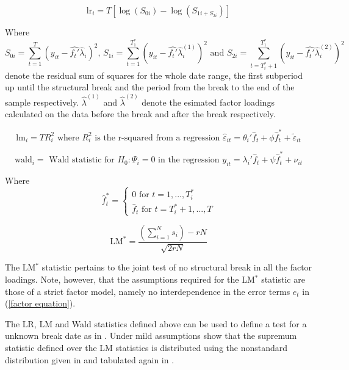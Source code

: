 \documentclass[12pt]{article}
\begin{document}
\begin{equation}
	\label{LR-Statistic}
	\text{lr}_i = T [ \log(S_{0i}) - \log(S_{1i + S_{2i}}) ]
\end{equation}

Where $$S_{0i} = \sum_{t=1}^{T}(y_{it} - \hat{f_t'} \hat \lambda_i)^2 \text{, } S_{1i} = \sum_{t=1}^{T_1^*}(y_{it} - \hat{f_t'} \hat \lambda_i^{(1)})^2 \text{ and } S_{2i} = \sum_{t=T^*_i+1}^{T_1^*}(y_{it} - \hat{f_t'} \hat \lambda_i^{(2)})^2 $$
denote the residual sum of squares for the whole date range, the first subperiod up until the structural break and the period from the break to the end of the sample respectively.
$\hat \lambda^{(1)}$ and $\hat \lambda^{(2)}$ denote the esimated factor loadings calculated on the data before the break and after the break respectively.

\begin{equation}
	\label{LM-Statistic}
	\text{lm}_i = T R^2_i \text{ where $R_i^2$ is the r-squared from a regression } \hat \varepsilon_{it} = \theta_i' \hat f_t + \phi \hat f_t^* + \tilde \varepsilon_{it}
\end{equation}

\begin{equation}
	\label{Wald-Statistic}
	\text{wald}_i = \text{ Wald statistic for $H_0: \Psi_i = 0$ in the regression } y_{it} = \lambda_i' \hat f_t + \psi \hat f_t^* + \nu_{it}
\end{equation}

Where 
$$\hat f_t^* = \begin{cases} 0 \text{ for } t=1, ..., T_i^* \\ \hat f_t \text{ for } t=T_i^*+1, ..., T \end{cases}$$

\begin{equation}
	\label{LM-Statistic}
	\text{LM}^* = \frac{\left( \sum_{i=1}^N s_i \right) -rN}{\sqrt{2rN}}
\end{equation}

The LM$^*$ statistic pertains to the joint test of no structural break in all the factor loadings. Note, however, that the assumptions required for the LM$^*$ statistic are those of a strict factor model, namely no interdependence in the error terms $e_t$ in (\ref{factor equation}).

The LR, LM and Wald statistics defined above can be used to define a test for a unknown break date as in \citet{andrews1993tests}. Under mild assumptions \citet{breitung2011testing} show that the supremum statistic defined over the LM statistics is distributed using the nonstandard distribution given in \citet{andrews1993tests} and tabulated again in \citet{andrews2003tests}.
\end{document}
